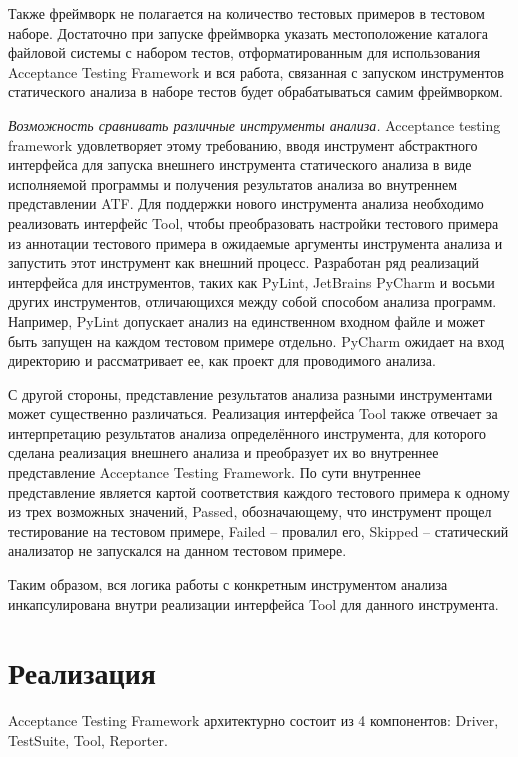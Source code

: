 Также фреймворк не полагается на количество тестовых примеров в тестовом наборе.
Достаточно при запуске фреймворка указать местоположение каталога файловой системы с набором тестов, отформатированным для использования Acceptance Testing
Framework и вся работа, связанная с запуском инструментов статического анализа в наборе тестов будет обрабатываться самим фреймворком.

\textit{Возможность сравнивать различные инструменты анализа.} Acceptance
testing framework удовлетворяет этому требованию, вводя инструмент абстрактного интерфейса для запуска внешнего инструмента статического анализа в виде исполняемой
программы и получения результатов анализа во внутреннем представлении ATF.
Для поддержки нового инструмента анализа необходимо
реализовать интерфейс Tool, чтобы преобразовать настройки тестового примера
из аннотации тестового примера в ожидаемые аргументы инструмента анализа
и запустить этот инструмент как внешний процесс. Разработан ряд реализаций
интерфейса для инструментов, таких как PyLint, JetBrains PyCharm и восьми других инструментов, отличающихся между собой способом анализа программ. Например,
PyLint допускает анализ на единственном входном файле и может быть запущен
на каждом тестовом примере отдельно. PyCharm ожидает на вход директорию и
рассматривает ее, как проект для проводимого анализа. 

С другой стороны, представление результатов анализа разными инструментами может существенно различаться. Реализация интерфейса Tool также
отвечает за интерпретацию результатов анализа определённого инструмента, для которого сделана реализация внешнего анализа и преобразует их
во внутреннее представление Acceptance Testing Framework. 
По сути внутреннее представление является картой соответствия каждого тестового примера к одному из трех возможных значений, Passed, обозначающему, что инструмент прощел тестирование на тестовом примере, Failed -- провалил его, Skipped -- статический анализатор не запускался на данном тестовом примере. 

Таким образом, вся логика работы с конкретным инструментом анализа инкапсулирована внутри реализации интерфейса Tool для данного инструмента.

\section{Реализация}\label{sec:ch3/sect2}

Acceptance Testing Framework архитектурно состоит из 4 компонентов:
Driver, TestSuite, Tool, Reporter.

